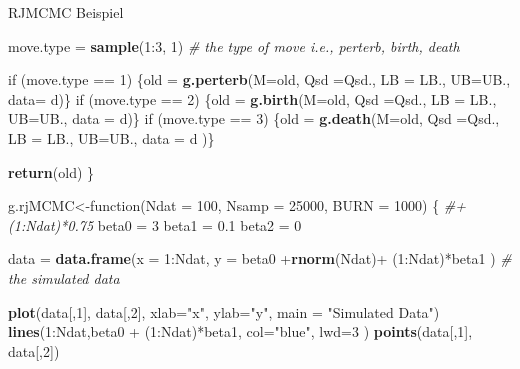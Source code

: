 \documentclass[ignorenonframetext,]{beamer}
\newenvironment{Shaded}{\begin{snugshade}}{\end{snugshade}}
\newcommand{\KeywordTok}[1]{\textcolor[rgb]{0.13,0.29,0.53}{\textbf{{#1}}}}
\newcommand{\DataTypeTok}[1]{\textcolor[rgb]{0.13,0.29,0.53}{{#1}}}
\newcommand{\DecValTok}[1]{\textcolor[rgb]{0.00,0.00,0.81}{{#1}}}
\newcommand{\FloatTok}[1]{\textcolor[rgb]{0.00,0.00,0.81}{{#1}}}
\newcommand{\StringTok}[1]{\textcolor[rgb]{0.31,0.60,0.02}{{#1}}}
\newcommand{\CommentTok}[1]{\textcolor[rgb]{0.56,0.35,0.01}{\textit{{#1}}}}
\newcommand{\NormalTok}[1]{{#1}}
\begin{document}
\begin{frame}{RJMCMC Beispiel}
\begin{Shaded}
\begin{Highlighting}[]
\NormalTok{move.type =}\StringTok{ }\KeywordTok{sample}\NormalTok{(}\DecValTok{1}\NormalTok{:}\DecValTok{3}\NormalTok{, }\DecValTok{1}\NormalTok{) }\CommentTok{# the type of move i.e., perterb, birth, death}

\NormalTok{if (move.type ==}\StringTok{ }\DecValTok{1}\NormalTok{) \{old =}\StringTok{ }\KeywordTok{g.perterb}\NormalTok{(}\DataTypeTok{M=}\NormalTok{old, }\DataTypeTok{Qsd =}\NormalTok{Qsd., }\DataTypeTok{LB =} \NormalTok{LB., }\DataTypeTok{UB=}\NormalTok{UB., }\DataTypeTok{data=} \NormalTok{d)\}}
\NormalTok{if (move.type ==}\StringTok{ }\DecValTok{2}\NormalTok{) \{old =}\StringTok{ }\KeywordTok{g.birth}\NormalTok{(}\DataTypeTok{M=}\NormalTok{old,  }\DataTypeTok{Qsd =}\NormalTok{Qsd., }\DataTypeTok{LB =} \NormalTok{LB., }\DataTypeTok{UB=}\NormalTok{UB., }\DataTypeTok{data =} \NormalTok{d)\}}
\NormalTok{if (move.type ==}\StringTok{ }\DecValTok{3}\NormalTok{) \{old =}\StringTok{ }\KeywordTok{g.death}\NormalTok{(}\DataTypeTok{M=}\NormalTok{old, }\DataTypeTok{Qsd =}\NormalTok{Qsd., }\DataTypeTok{LB =} \NormalTok{LB., }\DataTypeTok{UB=}\NormalTok{UB., }\DataTypeTok{data =} \NormalTok{d )\}}

\KeywordTok{return}\NormalTok{(old)}
\NormalTok{\}}
\end{Highlighting}
\end{Shaded}

\begin{Shaded}
\begin{Highlighting}[]
\NormalTok{g.rjMCMC<-function(}\DataTypeTok{Ndat =} \DecValTok{100}\NormalTok{, }\DataTypeTok{Nsamp =} \DecValTok{25000}\NormalTok{, }\DataTypeTok{BURN =} \DecValTok{1000}\NormalTok{)}
\NormalTok{\{}
\CommentTok{#+ (1:Ndat)*0.75}
\NormalTok{beta0 =}\StringTok{ }\DecValTok{3}
\NormalTok{beta1 =}\StringTok{ }\FloatTok{0.1}
\NormalTok{beta2 =}\StringTok{ }\DecValTok{0}

\NormalTok{data =}\StringTok{ }\KeywordTok{data.frame}\NormalTok{(}\DataTypeTok{x =} \DecValTok{1}\NormalTok{:Ndat, }\DataTypeTok{y =} \NormalTok{beta0  +}\KeywordTok{rnorm}\NormalTok{(Ndat)+}\StringTok{ }\NormalTok{(}\DecValTok{1}\NormalTok{:Ndat)*beta1  ) }\CommentTok{# the simulated data}

\KeywordTok{plot}\NormalTok{(data[,}\DecValTok{1}\NormalTok{], data[,}\DecValTok{2}\NormalTok{], }\DataTypeTok{xlab=}\StringTok{"x"}\NormalTok{, }\DataTypeTok{ylab=}\StringTok{"y"}\NormalTok{, }\DataTypeTok{main =} \StringTok{"Simulated Data"}\NormalTok{)}
\KeywordTok{lines}\NormalTok{(}\DecValTok{1}\NormalTok{:Ndat,beta0  +}\StringTok{  }\NormalTok{(}\DecValTok{1}\NormalTok{:Ndat)*beta1, }\DataTypeTok{col=}\StringTok{"blue"}\NormalTok{, }\DataTypeTok{lwd=}\DecValTok{3} \NormalTok{)}
\KeywordTok{points}\NormalTok{(data[,}\DecValTok{1}\NormalTok{], data[,}\DecValTok{2}\NormalTok{])}


\end{Highlighting}
\end{Shaded}
\end{frame}
\end{document}
